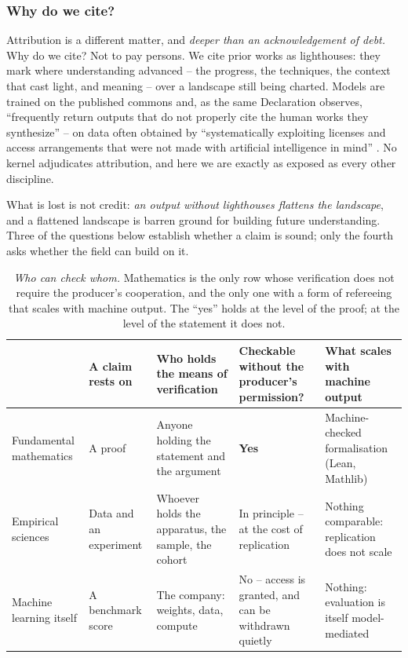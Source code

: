 \documentclass[11pt, a4paper,twosided]{amsart}
\newcommand{\key}[1]{\emph{#1}}
\begin{document}
\subsubsection{Why do we cite?} 
Attribution is a different matter, and \emph{deeper than an acknowledgement of debt.} Why do we cite? Not to pay persons. We cite prior works as lighthouses: they mark where understanding advanced -- the progress, the techniques, the context that cast light, and meaning -- over a landscape still being charted. Models are trained on the published commons and, as the same Declaration observes, ``frequently return outputs that do not properly cite the human works they synthesize'' -- on data often obtained by ``systematically exploiting licenses and access arrangements that were not made with artificial intelligence in mind'' \cite{leiden2026}. No kernel adjudicates attribution, and here we are exactly as exposed as every other discipline. 

What is lost is not credit: \key{an output without lighthouses flattens the landscape}, and a flattened landscape is barren ground for building future understanding. Three of the questions below establish whether a claim is sound; only the fourth asks whether the field can build on it.


\begin{table}[t]
\caption{\emph{Who can check whom.} Mathematics is the only row whose verification does not require the producer's cooperation, and the only one with a form of refereeing that scales with machine output. The ``yes'' holds at the level of the proof; at the level of the statement it does not.}
\label{tab:asymmetry}
\footnotesize
\setlength{\tabcolsep}{4pt}
\renewcommand{\arraystretch}{1.25}
\begin{tabular}{@{}>{\raggedright\arraybackslash\ttfamily}p{2.0cm}%
                  >{\raggedright\arraybackslash}p{2.6cm}%
                  >{\raggedright\arraybackslash}p{3.0cm}%
                  >{\raggedright\arraybackslash}p{2.6cm}%
                  >{\raggedright\arraybackslash}p{3.0cm}@{}}
\toprule
 & \textbf{A claim rests on} & \textbf{Who holds the means of verification} & \textbf{Checkable without the producer's permission?} & \textbf{What scales with machine output} \\
\midrule
Fundamental mathematics
  & A proof
  & Anyone holding the statement and the argument
  & \textbf{Yes}
  & Machine-checked formalisation (Lean, Mathlib) \\
Empirical sciences
  & Data and an experiment
  & Whoever holds the apparatus, the sample, the cohort
  & In principle -- at the cost of replication
  & Nothing comparable: replication does not scale \\
Machine learning itself
  & A benchmark score
  & The company: weights, data, compute
  & No -- access is granted, and can be withdrawn quietly
  & Nothing: evaluation is itself model-mediated \\
\bottomrule
\end{tabular}
\end{table}
\end{document}
